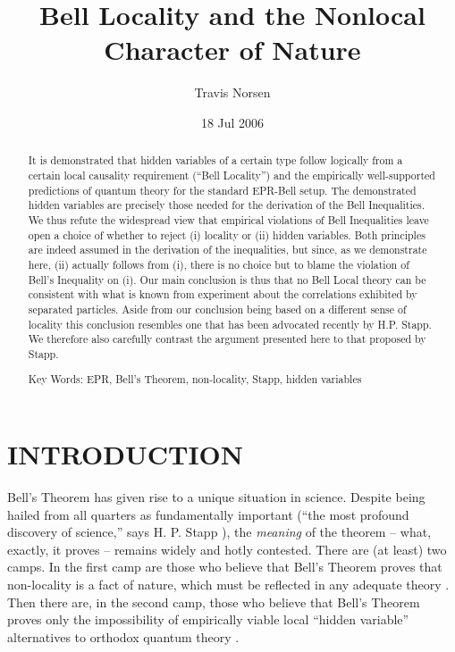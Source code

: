 \documentclass[aps,prc,onecolumn,12pt]{revtex4-2}
\begin{document}
\title{Bell Locality and the Nonlocal Character of Nature}
\author{Travis Norsen}

\date{18 Jul 2006}

\begin{abstract}
It is demonstrated that hidden variables of a certain type
follow logically from a certain local causality requirement (``Bell Locality'')
and the empirically well-supported predictions of
quantum theory for the standard EPR-Bell setup.
The demonstrated hidden variables are precisely
those needed for the derivation of the Bell Inequalities.  We
thus refute the widespread view that empirical violations of Bell
Inequalities leave open a choice of whether to reject (i) locality or
(ii) hidden variables.  Both principles are indeed assumed in the
derivation of the inequalities, but since, as we demonstrate here,
(ii) actually follows from (i), there is no choice but to blame the
violation of Bell's Inequality on (i).  Our main conclusion is thus
that no Bell Local theory can be consistent with what is known from
experiment about the correlations exhibited by separated particles.
Aside from our conclusion being based on a different sense of locality
this conclusion
resembles one that has been advocated recently by H.P. Stapp.
We therefore also carefully contrast
the argument presented here to that proposed by Stapp.

\bigskip

Key Words:  EPR, Bell's Theorem, non-locality, Stapp, hidden variables

\end{abstract}

\maketitle

\newpage

\section{INTRODUCTION}
\label{sec1}

Bell's Theorem \cite{bell} has given rise to a unique situation in
science.
Despite being hailed from all quarters as fundamentally important
(``the most profound discovery of science,'' says H. P. Stapp
\cite{stappquote}),
the \emph{meaning} of the theorem -- what, exactly, it proves -- remains
widely and hotly contested.  There are (at least) two camps.  In the
first camp are those who believe
that Bell's Theorem proves that non-locality is a fact of nature,
which must be reflected in any adequate theory
\cite{bell,maudlin,shelly,norsen,wiseman}.
Then there are, in the second camp,
those who believe that Bell's Theorem proves only the impossibility of
empirically viable local ``hidden variable'' alternatives to orthodox
quantum theory \cite{wigner,merminquote}.
\end{document}
